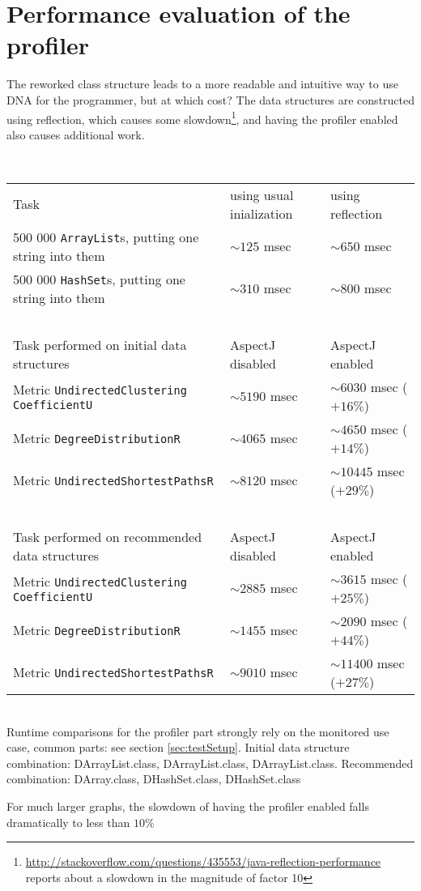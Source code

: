 \section{Performance evaluation of the profiler} \label{sec:performance}
	The reworked class structure leads to a more readable and intuitive way to use DNA for
	the programmer, but at which cost? The data structures are constructed using reflection,
	which causes some
	slowdown\footnote{\url{http://stackoverflow.com/questions/435553/java-reflection-performance}
	reports about a slowdown in the magnitude of factor 10}, and having the profiler
	enabled also causes additional work. 
	
	\ \\ 	
	\begin{center}
		\begin{tabular}{lll}
			Task & using usual inialization & using reflection \\
		    500 000 \texttt{ArrayList}s, putting one string into them & 
		    	$\sim 125$ msec & $\sim 650$ msec   \\
		    500 000 \texttt{HashSet}s, putting one string into them  &
		    	$\sim 310$ msec & $\sim 800$ msec \\
			~ & ~ & \\
			Task performed on initial data structures & AspectJ disabled & AspectJ enabled \\
	    	Metric \texttt{Undirected\allowbreak Clustering\allowbreak
				CoefficientU} & $\sim 5190$ msec & $\sim 6030$ msec ($+ 16\%$) \\
			Metric \texttt{Degree\allowbreak DistributionR} &
				$\sim 4065$ msec & $\sim 4650$ msec ($+ 14\%$) \\
			Metric \texttt{Undirected\allowbreak Shortest\allowbreak PathsR} &
				$\sim 8120$ msec & $\sim 10445$ msec ($+ 29\%$) \\
			~ & ~ & \\
			Task performed on recommended data structures & AspectJ disabled & AspectJ enabled \\
	    	Metric \texttt{Undirected\allowbreak Clustering\allowbreak
				CoefficientU} & $\sim 2885$ msec & $\sim 3615$ msec ($+ 25\%$) \\
			Metric \texttt{Degree\allowbreak DistributionR} &
				$\sim 1455$ msec & $\sim 2090$ msec ($+ 44\%$) \\
			Metric \texttt{Undirected\allowbreak Shortest\allowbreak PathsR} &
				$\sim 9010$ msec & $\sim 11400$ msec ($+ 27\%$) \\				
	    \end{tabular}
	\end{center}
	    
	\ \\
	Runtime comparisons for the profiler part strongly rely on the monitored use
	case, common parts: see section \ref{sec:testSetup}. Initial data structure combination:
	DArrayList.class, DArrayList.class, DArrayList.class. Recommended combination: 		
	DArray.class, DHashSet.class, DHashSet.class
	
	For much larger graphs, the slowdown of having the profiler enabled falls dramatically to
	less than $10 \%$
